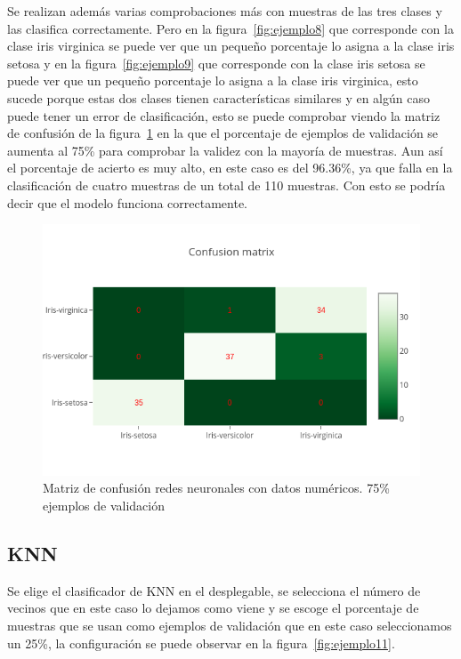 \documentclass[a4paper, 12pt]{book}
\begin{document}
Se realizan además varias comprobaciones más con muestras de las tres clases y las clasifica correctamente. Pero en la figura~\ref{fig:ejemplo8} que corresponde con la clase iris virginica se puede ver que un pequeño porcentaje lo asigna a la clase iris setosa y en la figura~\ref{fig:ejemplo9} que corresponde con la clase iris setosa se puede ver que un pequeño porcentaje lo asigna a la clase iris virginica, esto sucede porque estas dos clases tienen características similares y en algún caso puede tener un error de clasificación, esto se puede comprobar viendo la matriz de confusión de la figura~\ref{fig:ejemplo10} en la que el porcentaje de ejemplos de validación se aumenta al 75\% para comprobar la validez con la mayoría de muestras. 
Aun así el porcentaje de acierto es muy alto, en este caso es del 96.36\%, ya que falla en la clasificación de cuatro muestras de un total de 110 muestras. Con esto se podría decir que el modelo funciona correctamente.
\begin{figure}
	\centering
	\includegraphics[width=12cm, keepaspectratio]{img/cm_num_rn2.png}
	\caption{Matriz de confusión redes neuronales con datos numéricos. 75\% ejemplos de validación} 	
	\label{fig:ejemplo10}
\end{figure}

\subsection{KNN}
\label{subsec:knn}

Se elige el clasificador de KNN en el desplegable, se selecciona el número de vecinos que en este caso lo dejamos como viene y se escoge el porcentaje de muestras que se usan como ejemplos de validación que en este caso seleccionamos un 25\%, la configuración se puede observar en la figura~\ref{fig:ejemplo11}.
\end{document}

